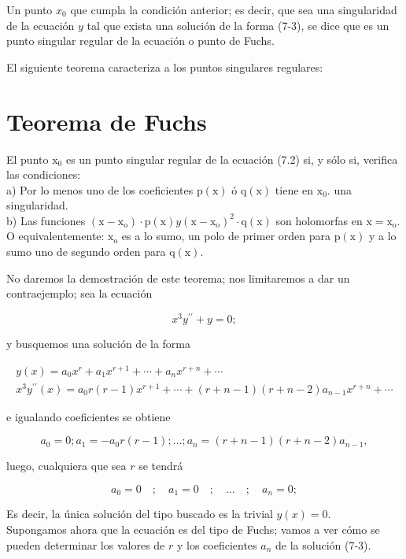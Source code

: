 \documentclass[10pt]{article}
\theoremstyle{plain}
\theoremstyle{definition}
\theoremstyle{remark}
\begin{document}
Un punto $x_{0}$ que cumpla la condición anterior; es decir, que sea una singularidad de la ecuación $y$ tal que exista una solución de la forma (7-3), se dice que es un punto singular regular de la ecuación o punto de Fuchs.

El siguiente teorema caracteriza a los puntos singulares regulares:


\section*{Teorema de Fuchs}
El punto $\mathrm{x}_{0}$ es un punto singular regular de la ecuación (7.2) si, y sólo si, verifica las condiciones:\\
a) Por lo menos uno de los coeficientes $\mathrm{p}(\mathrm{x})$ ó $\mathrm{q}(\mathrm{x})$ tiene en $\mathrm{x}_{0}$. una singularidad.\\
b) Las funciones $\left(\mathrm{x}-\mathrm{x}_{\mathrm{o}}\right) \cdot \mathrm{p}(\mathrm{x}) y\left(\mathrm{x}-\mathrm{x}_{\mathrm{o}}\right)^{2} \cdot \mathrm{q}(\mathrm{x})$ son holomorfas en $\mathrm{x}=\mathrm{x}_{\mathrm{o}}$. O equivalentemente: $\mathrm{x}_{\mathrm{o}}$ es a lo sumo, un polo de primer orden para $\mathrm{p}(\mathrm{x})$ y a lo sumo uno de segundo orden para $\mathrm{q}(\mathrm{x})$.

No daremos la demostración de este teorema; nos limitaremos a dar un contraejemplo; sea la ecuación

$$
x^{3} y^{\prime \prime}+y=0 ;
$$

y busquemos una solución de la forma

$$
\begin{gathered}
y(x)=a_{0} x^{r}+a_{1} x^{r+1}+\cdots+a_{n} x^{r+n}+\cdots \\
x^{3} y^{\prime \prime}(x)=a_{0} r(r-1) x^{r+1}+\cdots+(r+n-1)(r+n-2) a_{n-1} x^{r+n}+\cdots
\end{gathered}
$$

e igualando coeficientes se obtiene

$$
a_{0}=0 ; a_{1}=-a_{0} r(r-1) ; \ldots ; a_{n}=(r+n-1)(r+n-2) a_{n-1},
$$

luego, cualquiera que sea $r$ se tendrá

$$
a_{0}=0 \quad ; \quad a_{1}=0 \quad ; \quad \ldots \quad ; \quad a_{n}=0 ;
$$

Es decir, la única solución del tipo buscado es la trivial $y(x)=0$.\\
Supongamos ahora que la ecuación es del tipo de Fuchs; vamos a ver cómo se pueden determinar los valores de $r$ y los coeficientes $a_{n}$ de la solución (7-3).
\end{document}
